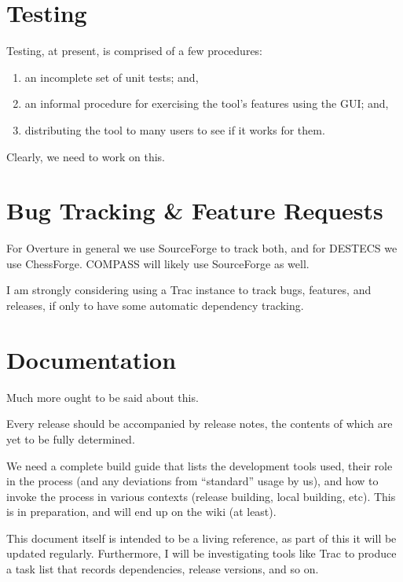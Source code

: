 \documentclass{overturerep}
\newenvironment{denseenumerate}
  {\begin{enumerate}\setlength{\itemsep}{0pt}\setlength{\parskip}{0pt}\setlength{\parsep}{0pt}}
  {\end{enumerate}}
\begin{document}
\section{Testing}

  Testing, at present, is comprised of a few procedures:

\begin{denseenumerate}
\item an incomplete set of unit tests; and,
\item an informal procedure for exercising the tool's features using the GUI; and,
\item distributing the tool to many users to see if it works for them.
\end{denseenumerate}

  Clearly, we need to work on this.

\section{Bug Tracking \& Feature Requests}

  For Overture in general we use SourceForge to track both, and for
  DESTECS we use ChessForge.  COMPASS will likely use SourceForge as
  well.

  I am strongly considering using a Trac instance to track bugs,
  features, and releases, if only to have some automatic dependency
  tracking.

\section{Documentation}

  Much more ought to be said about this.

  Every release should be accompanied by release notes, the contents
  of which are yet to be fully determined.

  We need a complete build guide that lists the development tools
  used, their role in the process (and any deviations from
  ``standard'' usage by us), and how to invoke the process in various
  contexts (release building, local building, etc).  This is in
  preparation, and will end up on the wiki (at least).

  This document itself is intended to be a living reference, as part
  of this it will be updated regularly.  Furthermore, I will be
  investigating tools like Trac to produce a task list that records
  dependencies, release versions, and so on.
\end{document}
